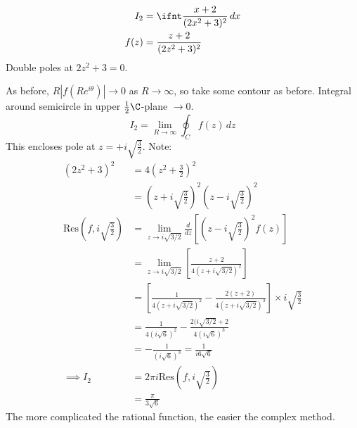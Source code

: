 \documentclass[a4paper, 11pt, normalem]{report}
\begin{document}
\begin{example}[2]
    \begin{align}
        I_2 &= \ifnt \frac{x+2}{(2x^2 + 3)^2}\,dx \\
        f(z) &= \frac{z+2}{(2z^2 + 3)^2}
    \end{align}
    Double poles at $2z^2 + 3 = 0$.

    As before, $R|f(Re^{i\theta})| \to 0$ as $R \to \infty$, so take some contour as before. 
    Integral around semicircle in upper $\frac{1}{2}\C$-plane $\to 0$.
    \begin{equation}
        I_2 = \lim_{R\to\infty} \oint_C f(z)\,dz
    \end{equation}
    This encloses pole at $z = +i\sqrt{\frac{3}{2}}$.
    Note:
    \begin{align}
        (2z^2 + 3)^2 &= 4\left(z^2 + \frac{3}{2}\right)^2 \\
                     &= \left(z + i\sqrt{\frac{3}{2}}\right)^2\left(z - i\sqrt{\frac{3}{2}}\right)^2 \\
        \text{Res}\left(f, i\sqrt{\frac{3}{2}}\right) &= \lim_{z\to i\sqrt{3/2}} \frac{d}{dz}\left[ \left(z - i\sqrt{\frac{3}{2}}\right)^2f(z)\right] \\
                                                      &= \lim_{z\to i\sqrt{3/2}} \left[\frac{z+2}{4(z+i\sqrt{3/2})^2}\right] \\
                                                      &= \left[\frac{1}{4(z + i\sqrt{3/2})^2} - \frac{2(z+2)}{4(z + i\sqrt{3/2})^3}\right]\times i\sqrt{\frac{3}{2}} \\
                                                      &= \frac{1}{4(i\sqrt{6})^2} - \frac{2(i\sqrt{3/2} + 2}{4(i\sqrt{6})^3} \\
                                                      &= -\frac{1}{(i\sqrt{6})^3} = \frac{1}{i6\sqrt{6}} \\
        \implies I_2 &= 2\pi i\text{Res}\left(f, i\sqrt{\frac{3}{2}}\right) \\
                     &= \frac{\pi}{3\sqrt{6}}
    \end{align}
    The more complicated the rational function, the easier the complex method. 
\end{example}
\end{document}
